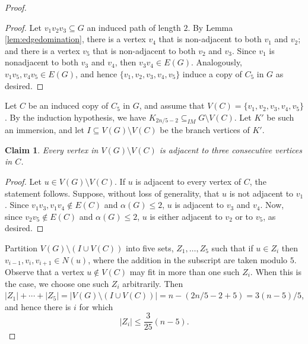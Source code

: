 \documentclass[a4paper,12pt]{article}
\newtheorem{claim}{Claim}[theorem]
\newcommand{\imm}{\subseteq_{IM}}
\begin{document}
\begin{proof}
\begin{proof}
    Let \(v_1v_2v_3 \subseteq G\) an induced path of length \(2\).
    By Lemma \ref{lem:edgedomination}, there is a vertex $v_4$ that is non-adjacent to both $v_1$ and $v_2$;
    and there is a vertex $v_5$ that is non-adjacent to both $v_2$ and $v_3$.
    Since \(v_1\) is nonadjacent to both \(v_3\) and \(v_4\),
    then \(v_3v_4\in E(G)\).
    Analogously, \(v_1v_5, v_4v_5\in E(G)\),
    and hence \(\{v_1,v_2,v_3,v_4,v_5\}\) induce a copy of \(C_5\)
    in \(G\) as desired.
%
\end{proof}


    Let \(C\) be an induced copy of \(C_5\) in \(G\),
    and assume that \(V(C) = \{v_1,v_2,v_3,v_4,v_5\}\).
    By the induction hypothesis, we have \(K_{2n/5 - 2} \imm G\setminus V(C)\).
    Let \(K'\) be such an immersion,
    and let \(I \subseteq V(G)\setminus V(C)\) be the branch vertices of \(K'\).

    \begin{claim}
        Every vertex in $V(G)\setminus V(C)$ is adjacent to three consecutive vertices in $C$.
    \end{claim}
    \begin{proof}
    Let \(u \in V(G)\setminus V(C)\).
    If $u$ is adjacent to every vertex of $C$, the statement follows.
    Suppose, without loss of generality, that $u$ is not adjacent to $v_1$. 
    Since $v_1v_3,v_1v_4\not\in E(C)$ and \(\alpha(G) \leq 2\),
    $u$ is adjacent to $v_3$ and $v_4$. 
    Now, since $v_2v_5\not\in E(C)$ and \(\alpha(G) \leq 2\), 
    \(u\) is either adjacent to \(v_2\) or to \(v_5\),
    as desired.
    \end{proof}

    Partition $V(G)\setminus(I\cup V(C))$ into five sets, $Z_1, \ldots, Z_5$ such that if $u\in Z_i$ then $v_{i-1},v_i,v_{i+1}\in N(u)$,
    where the addition in the subscript are taken modulo \(5\).
    Observe that a vertex \(u \notin V(C)\) may fit in more than one such \(Z_i\).
    When this is the case, we choose one such \(Z_i\) arbitrarily.
    Then \(|Z_1| + \cdots + |Z_5| = |V(G)\setminus(I\cup V(C))| = n - (2n/5 - 2 + 5) = 3(n-5)/5\), and hence there is $i$ for which
    \begin{equation}\label{eq:Zi}
        |Z_i|\leq\frac{3}{25}(n-5).
    \end{equation}


\end{proof}
\end{document}
